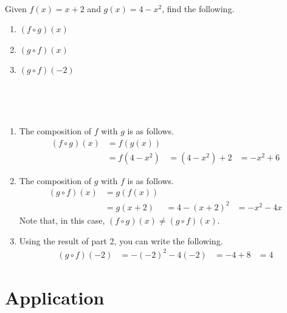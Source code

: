 \begin{example} \cite{ci}~\\
    Given $f(x)=x+2$ and $g(x)=4-x^2$, find the following.
    \begin{enumerate}
        \item $(f\circ g)(x)$ 
        \item $(g\circ f)(x)$
        \item $(g\circ f)(-2)$ 
    \end{enumerate}~\\
    \begin{solution}~\\
        \begin{enumerate}
            \item The composition of $f$ with $g$ is as follows.
            \begin{align*}
                (f\circ g)(x) &= f(g(x))\\
                &=f(4-x^2)
                &=(4-x^2)+2
                &=-x^2+6
            \end{align*}
            \item The composition of $g$ with $f$ is as follows.
            \begin{align*}
                (g\circ f)(x) &= g(f(x))\\
                &=g(x+2)
                &=4-(x+2)^2
                &=-x^2-4x
            \end{align*}
            Note that, in this case, $(f\circ g)(x)\neq (g\circ f)(x)$.
            \item Using the result of part 2, you can write the following.
            \begin{align*}
                (g\circ f)(-2) &=-(-2)^2-4(-2)
                &= -4+8
                &= 4
            \end{align*}
        \end{enumerate}
    \end{solution}
\end{example}

\section{Application}

